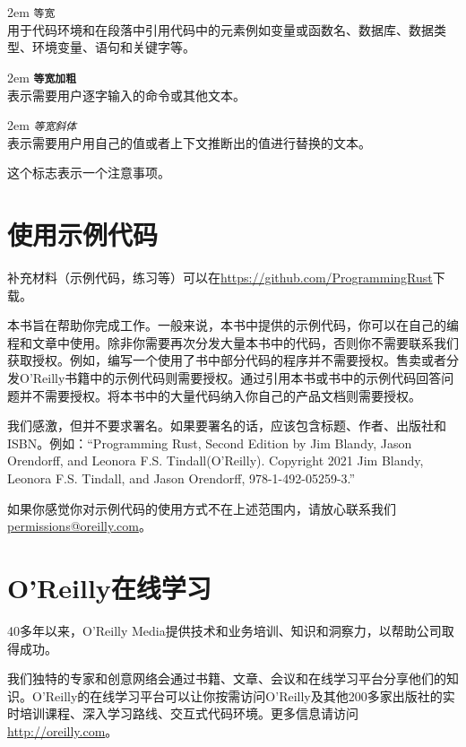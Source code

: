\hangindent 2em
\noindent
\texttt{等宽}\\
用于代码环境和在段落中引用代码中的元素例如变量或函数名、数据库、数据类型、环境变量、语句和关键字等。

\hangindent 2em
\noindent
\textbf{\texttt{等宽加粗}}\\
表示需要用户逐字输入的命令或其他文本。

\hangindent 2em
\noindent
\emph{\texttt{等宽斜体}}\\
表示需要用户用自己的值或者上下文推断出的值进行替换的文本。

\begin{note}
    这个标志表示一个注意事项。
\end{note}

\section*{使用示例代码}
补充材料（示例代码，练习等）可以在\url{https://github.com/ProgrammingRust}下载。

本书旨在帮助你完成工作。一般来说，本书中提供的示例代码，你可以在自己的编程和文章中使用。除非你需要再次分发大量本书中的代码，否则你不需要联系我们获取授权。例如，编写一个使用了书中部分代码的程序并不需要授权。售卖或者分发O'Reilly书籍中的示例代码则需要授权。通过引用本书或书中的示例代码回答问题并不需要授权。将本书中的大量代码纳入你自己的产品文档则需要授权。

我们感激，但并不要求署名。如果要署名的话，应该包含标题、作者、出版社和ISBN。例如：“Programming Rust, Second Edition by Jim Blandy, Jason Orendorff, and Leonora F.S. Tindall(O’Reilly). Copyright 2021 Jim Blandy, Leonora F.S. Tindall, and Jason Orendorff, 978-1-492-05259-3.”

如果你感觉你对示例代码的使用方式不在上述范围内，请放心联系我们\url{permissions@oreilly.com}。

\section*{O'Reilly在线学习}
\begin{note}
    40多年以来，O'Reilly Media提供技术和业务培训、知识和洞察力，以帮助公司取得成功。
\end{note}

我们独特的专家和创意网络会通过书籍、文章、会议和在线学习平台分享他们的知识。O'Reilly的在线学习平台可以让你按需访问O'Reilly及其他200多家出版社的实时培训课程、深入学习路线、交互式代码环境。更多信息请访问\url{http://oreilly.com}。

